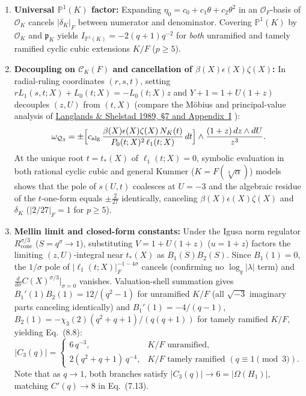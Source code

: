 \documentclass[11pt,letterpaper]{article}
\newcommand{\OF}{\mathcal{O}_F}
\begin{document}
\begin{enumerate}[1.]
\item \textbf{Universal $\mathbb{P}^1(K)$ factor:} Expanding $\eta_0=c_0+c_1\theta+c_2\theta^2$ in an $\OF$-basis of $\mathcal{O}_K$ cancels $|\delta_K|_F$ between numerator and denominator. Covering $\mathbb{P}^1(K)$ by $\mathcal{O}_K$ and $\mathfrak p_K$ yields $I_{\mathbb{P}^1(K)}=-2(q+1)q^{-2}$ for \emph{both} unramified and tamely ramified cyclic cubic extensions $K/F$ ($p\ge 5$).
\item \textbf{Decoupling on $\mathcal{C}_K(F)$ and cancellation of $\beta(X)\epsilon(X)\zeta(X)$:} In radial-ruling coordinates $(r,s,t)$, setting $rL_1(s,t;X)+L_0(t;X)=-L_0(t;X)z$ and $Y+1=1+U(1+z)$ decouples $(z,U)$ from $(t,X)$ (compare the M\"obius and principal-value analysis of \href{https://publications.ias.edu/sites/default/files/orbital-integrals-ii_rpl.pdf}{Langlands \& Shelstad 1989, \S7 and Appendix~I} \cite{LS89}):
\[
\omega_{\mathcal{Q}_3}=\pm\Bigl[c_{\mathrm{alg}}\,\frac{\beta(X)\epsilon(X)\zeta(X)\,N_K(t)}{P_0(t;X)^2\,\ell_1(t;X)}\,dt\Bigr]\wedge\frac{(1+z)\,dz\wedge dU}{z^3}.
\]
At the unique root $t=t_*(X)$ of $\ell_1(t;X)=0$, symbolic evaluation in both rational cyclic cubic and general Kummer ($K=F(\sqrt[3]{\alpha})$) models shows that the pole of $s(U,t)$ coalesces at $U=-3$ and the algebraic residue of the $t$-one-form equals $\pm\frac{2}{27}$ identically, canceling $\beta(X)\epsilon(X)\zeta(X)$ and $\delta_K$ ($|2/27|_F=1$ for $p\ge 5$).
\item \textbf{Mellin limit and closed-form constants:} Under the Igusa norm regulator $R_{\mathrm{cone}}^{\sigma/3}$ ($S=q^\sigma\to 1$), substituting $V=1+U(1+z)$ ($u=1+z$) factors the limiting $(z,U)$-integral near $t_*(X)$ as $B_1(S)B_2(S)$. Since $B_1(1)=0$, the $1/\sigma$ pole of $|\ell_1(t;X)|_F^{-1-4\sigma}$ cancels (confirming no $\log_q|\lambda|$ term) and $\frac{d}{d\sigma}C(X)^{\sigma/3}\big|_{\sigma=0}$ vanishes. Valuation-shell summation gives $B_1'(1)B_2(1)=12/(q^2-1)$ for unramified $K/F$ (all $\sqrt{-3}$ imaginary parts canceling identically) and $B_1'(1)=-4/(q-1)$, $B_2(1)=-\chi_3(2)(q^2+q+1)/(q(q+1))$ for tamely ramified $K/F$, yielding Eq.~(8.8):
\[
|C_3(q)|=\begin{cases}
6\,q^{-3}, & K/F\text{ unramified},\\[3pt]
2(q^2+q+1)\,q^{-4}, & K/F\text{ tamely ramified }(q\equiv 1\pmod 3).
\end{cases}
\]
Note that as $q\to 1$, both branches satisfy $|C_3(q)|\to 6=|\Omega(H_1)|$, matching $C'(q)\to 8$ in Eq.~(7.13).
\end{enumerate}
\end{document}
